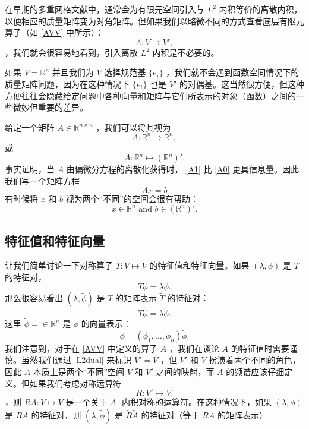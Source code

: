 \documentclass[12pt]{acta_2011xz}
\begin{document}
在早期的多重网格文献中，通常会为有限元空间引入与    $L^2$    内积等价的离散内积，以便相应的质量矩阵变为对角矩阵。但如果我们以略微不同的方式查看底层有限元算子（如    \eqref{AVV}    中所示）：
   \begin{equation}
  \label{AVVdual}
A: V\mapsto V',  
\end{equation}   ，我们就会很容易地看到，引入离散
   $L^2$    内积是不必要的。  

如果    $V=\mathbb R^n$    并且我们为    $V$    选择规范基    $ \{ e_i \} $    ，我们就不会遇到函数空间情况下的质量矩阵问题，因为在这种情况下    $ \{ e_i \} $    也是    $V'$    的对偶基。这当然很方便，但这种方便往往会隐藏给定问题中各种向量和矩阵与它们所表示的对象（函数）之间的一些微妙但重要的差异。  

给定一个矩阵    $A\in \mathbb R^{n\times n}$    ，我们可以将其视为
   \begin{equation}
  \label{A0}
A: \mathbb R^{n}\mapsto \mathbb R^{n},
\end{equation}    或
   \begin{equation}
  \label{A1}
A: \mathbb R^{n}\mapsto (\mathbb R^{n})'.  
\end{equation}    事实证明，当    $A$    由偏微分方程的离散化获得时，   \eqref{A1}    比
   \eqref{A0}    更具信息量。因此我们写一个矩阵方程
   \begin{equation}
  \label{Axb}
Ax=b  
\end{equation}    有时候将    $x$    和    $b$    视为两个“不同”的空间会很有帮助：
   \begin{equation}
  \label{xb}
x\in   \mathbb R^{n} \mbox{ and } b\in (\mathbb R^{n})'.  
\end{equation}     

   \subsection{特征值和特征向量  }    让我们简单讨论一下对称算子    $T: V\mapsto V$    的特征值和特征向量。如果    $(\lambda, \phi)$    是    $T$    的特征对，
   $$
T\phi=\lambda \phi.
$$    那么很容易看出    $(\lambda, \tilde\phi)$    是    $T$    的矩阵表示    $\tilde T$    的特征对：
   $$
\tilde T\tilde\phi=\lambda\tilde \phi. 
$$    这里    $\tilde\phi=\in \mathbb R^n$    是    $\phi$    的向量表示：
   $$
\phi=(\phi_1, \ldots,\phi_n)\tilde\phi.
$$    我们注意到，对于在    \eqref{AVV}    中定义的算子    $A$    ，我们在谈论    $A$    的特征值时需要谨慎。虽然我们通过    \eqref{L2dual}    来标识
   $V'=V$    ，但    $V'$    和    $V$    扮演着两个不同的角色，因此    $A$    本质上是两个“不同”空间
   $V$    和    $V'$    之间的映射，而    $A$    的频谱应该仔细定义。但如果我们考虑对称运算符
   \begin{equation}
  \label{RVV}
R: V'\mapsto V.  
\end{equation}    ，则    $RA: V\mapsto V$    是一个关于
   $A$    -内积对称的运算符。在这种情况下，如果    $(\lambda, \phi)$    是    $RA$    的特征对，则    $(\lambda, \tilde \phi)$    是    $\tilde
R\tilde A$    的特征对（等于    $RA$    的矩阵表示）  
\end{document}

